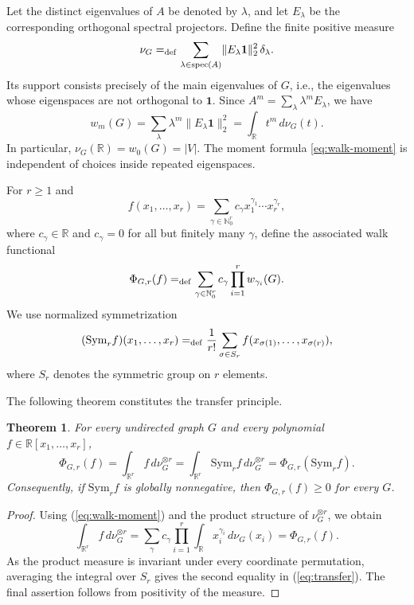 \documentclass[11pt]{article}
\newtheorem{theorem}[definition]{Theorem}
\newcommand{\Nat}{\mathbb{N}}
\newcommand{\Real}{\mathbb{R}}
\newcommand{\Sym}{\mathrm{Sym}}
\newcommand{\one}{\mathbf{1}}
\theoremstyle{remark}
\begin{document}
Let the distinct eigenvalues of $A$ be denoted by $\lambda$, and let $E_\lambda$ be the corresponding orthogonal spectral projectors.  Define the finite positive measure
\begin{equation*}\label{eq:spectral-measure}
  \nu_G=_{\rm def}\sum_{\lambda\in\operatorname{spec}(A)}
        \lVert E_\lambda\one\rVert_2^2\,\delta_\lambda.
\end{equation*}
Its support consists precisely of the main eigenvalues of $G$, i.e., the eigenvalues whose eigenspaces are not orthogonal to $\one$.  Since $A^m=\sum_\lambda\lambda^mE_\lambda$, we have
\begin{equation}\label{eq:walk-moment}
  w_m(G)
  =\sum_\lambda \lambda^m\lVert E_\lambda\one\rVert_2^2
  =\int_{\Real}t^m\,d\nu_G(t).
\end{equation}
In particular, $\nu_G(\Real)=w_0(G)=|V|$.  The moment formula
\eqref{eq:walk-moment} is independent of choices inside repeated
eigenspaces.

For $r\geq 1$ and
\[
  f(x_1,\ldots,x_r)=\sum_{\gamma\in\Nat_0^r}c_\gamma
       x_1^{\gamma_1}\cdots x_r^{\gamma_r},
\]
where $c_\gamma \in \Real$ and $c_\gamma=0$ for all but finitely many $\gamma$, 
define the associated walk functional
\begin{equation*}\label{eq:walk-functional}
  \Phi_{G,r}(f)=_{\rm def}
  \sum_{\gamma\in\Nat_0^r}c_\gamma
       \prod_{i=1}^r w_{\gamma_i}(G).
\end{equation*}
We use normalized symmetrization
\begin{equation*}\label{eq:symmetrization}
  (\Sym_r f)(x_1,\ldots,x_r)
  =_{\rm def} \frac{1}{r!}\sum_{\sigma\in S_r}
       f(x_{\sigma(1)},\ldots,x_{\sigma(r)}),
\end{equation*}
where $S_r$ denotes the symmetric group on $r$ elements.

The following theorem constitutes the transfer principle.

\begin{theorem}\label{thm:transfer}
For every undirected graph $G$ and every polynomial
$f\in\Real[x_1,\ldots,x_r]$,
\begin{equation}\label{eq:transfer}
  \Phi_{G,r}(f)
  =\int_{\Real^r}f\,d\nu_G^{\otimes r}
  =\int_{\Real^r}\Sym_r f\,d\nu_G^{\otimes r}
  =\Phi_{G,r}(\Sym_r f).
\end{equation}
Consequently, if $\Sym_r f$ is globally nonnegative, then
$\Phi_{G,r}(f)\geq 0$ for every $G$.
\end{theorem}

\begin{proof}
Using (\ref{eq:walk-moment}) and the product structure of
$\nu_G^{\otimes r}$, we obtain
\[
  \int_{\Real^r}f\,d\nu_G^{\otimes r}
  =\sum_\gamma c_\gamma
       \prod_{i=1}^r\int_\Real x_i^{\gamma_i}\,d\nu_G(x_i)
  =\Phi_{G,r}(f).
\]
As the product measure is invariant under every coordinate permutation, averaging the integral over $S_r$ gives the second equality in (\ref{eq:transfer}). The final assertion follows from positivity of the measure.
\end{proof}
\end{document}
